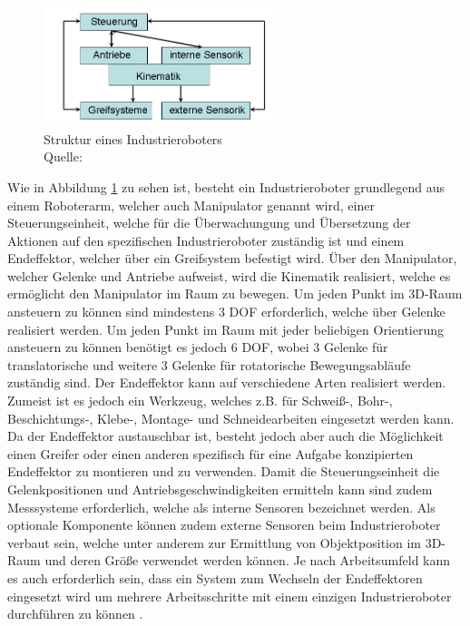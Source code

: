 \begin{figure}[htb]
	\centering
	\includegraphics[width=0.6\textwidth]{images/stand_der_technik/Struktur_IR}
	\caption[Struktur eines Industrieroboters]{Struktur eines Industrieroboters \\Quelle: \cite{industrieroboter_2020}}
	\label{fig:struktur_eines_industrieroboters}
\end{figure}
\FloatBarrier

Wie in Abbildung \ref{fig:struktur_eines_industrieroboters} zu sehen ist, besteht ein Industrieroboter grundlegend aus einem Roboterarm, welcher auch Manipulator genannt wird, einer Steuerungseinheit, welche für die Überwachungung und Übersetzung der Aktionen auf den spezifischen Industrieroboter zuständig ist und einem Endeffektor, welcher über ein Greifsystem befestigt wird. Über den Manipulator, welcher Gelenke und Antriebe aufweist, wird die Kinematik realisiert, welche es ermöglicht den Manipulator im Raum zu bewegen. Um jeden Punkt im 3D-Raum ansteuern zu können sind mindestens 3 DOF erforderlich, welche über Gelenke realisiert werden. Um jeden Punkt im Raum mit jeder beliebigen Orientierung ansteuern zu können benötigt es jedoch 6 DOF, wobei 3 Gelenke für translatorische und weitere 3 Gelenke für rotatorische Bewegungsabläufe zuständig sind. Der Endeffektor kann auf verschiedene Arten realisiert werden. Zumeist ist es jedoch ein Werkzeug, welches z.B. für Schweiß-, Bohr-, Beschichtungs-, Klebe-, Montage- und Schneidearbeiten eingesetzt werden kann. Da der Endeffektor austauschbar ist, besteht jedoch aber auch die Möglichkeit einen Greifer oder einen anderen spezifisch für eine Aufgabe konzipierten Endeffektor zu montieren und zu verwenden. Damit die Steuerungseinheit die Gelenkpositionen und Antriebsgeschwindigkeiten ermitteln kann sind zudem Messsysteme erforderlich, welche als interne Sensoren bezeichnet werden. Als optionale Komponente können zudem externe Sensoren beim Industrieroboter verbaut sein, welche unter anderem zur Ermittlung von Objektposition im 3D-Raum und deren Größe verwendet werden können. Je nach Arbeitsumfeld kann es auch erforderlich sein, dass ein System zum Wechseln der Endeffektoren eingesetzt wird um mehrere Arbeitsschritte mit einem einzigen Industrieroboter durchführen zu können \cite{hagele_aufbau_2006}.

